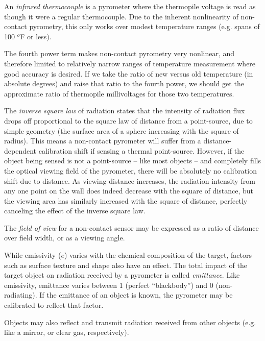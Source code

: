 \vskip 10pt

An {\it infrared thermocouple} is a pyrometer where the thermopile voltage is read as though it were a regular thermocouple.  Due to the inherent nonlinearity of non-contact pyrometry, this only works over modest temperature ranges (e.g. spans of 100 $^{o}$F or less).

\vskip 10pt

The fourth power term makes non-contact pyrometry very nonlinear, and therefore limited to relatively narrow ranges of temperature measurement where good accuracy is desired.  If we take the ratio of new versus old temperature (in absolute degrees) and raise that ratio to the fourth power, we should get the approximate ratio of thermopile millivoltages for those two temperatures.

\vskip 10pt

The {\it inverse square law} of radiation states that the intensity of radiation flux drops off proportional to the square law of distance from a point-source, due to simple geometry (the surface area of a sphere increasing with the square of radius).  This means a non-contact pyrometer will suffer from a distance-dependent calibration shift if sensing a thermal point-source.  However, if the object being sensed is not a point-source -- like most objects -- and completely fills the optical viewing field of the pyrometer, there will be absolutely no calibration shift due to distance.  As viewing distance increases, the radiation intensity from any one point on the wall does indeed decrease with the square of distance, but the viewing area has similarly increased with the square of distance, perfectly canceling the effect of the inverse square law.

\vskip 10pt

The {\it field of view} for a non-contact sensor may be expressed as a ratio of distance over field width, or as a viewing angle.

\vskip 10pt

While emissivity ($e$) varies with the chemical composition of the target, factors such as surface texture and shape also have an effect.  The total impact of the target object on radiation received by a pyrometer is called {\it emittance}.  Like emissivity, emittance varies between 1 (perfect ``blackbody'') and 0 (non-radiating).  If the emittance of an object is known, the pyrometer may be calibrated to reflect that factor.

\vskip 10pt

Objects may also reflect and transmit radiation received from other objects (e.g. like a mirror, or clear gas, respectively).


